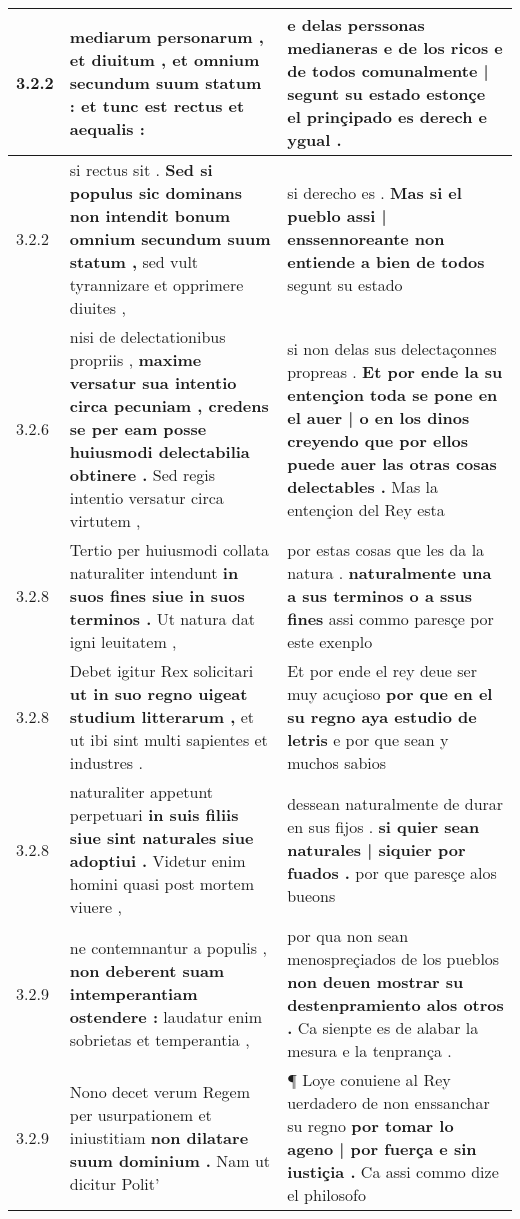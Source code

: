 \begin{tabular}{|p{1cm}|p{6.5cm}|p{6.5cm}|}
3.2.2 & mediarum personarum , et diuitum , \textbf{ et omnium secundum suum statum : } et tunc est rectus et aequalis : & e delas perssonas medianeras e de los ricos \textbf{ e de todos comunalmente | segunt su estado } estonçe el prinçipado es derech e ygual . \\\hline
3.2.2 & si rectus sit . \textbf{ Sed si populus sic dominans non intendit bonum omnium secundum suum statum , } sed vult tyrannizare et opprimere diuites , & si derecho es . \textbf{ Mas si el pueblo assi | enssennoreante non entiende a bien de todos } segunt su estado \\\hline
3.2.6 & nisi de delectationibus propriis , \textbf{ maxime versatur sua intentio circa pecuniam , credens se per eam posse huiusmodi delectabilia obtinere . } Sed regis intentio versatur circa virtutem , & si non delas sus delectaçonnes propreas . \textbf{ Et por ende la su entençion toda se pone en el auer | o en los dinos creyendo que por ellos puede auer las otras cosas delectables . } Mas la entençion del Rey esta \\\hline
3.2.8 & Tertio per huiusmodi collata naturaliter intendunt \textbf{ in suos fines siue in suos terminos . } Ut natura dat igni leuitatem , & por estas cosas que les da la natura . \textbf{ naturalmente una a sus terminos o a ssus fines } assi commo paresçe por este exenplo \\\hline
3.2.8 & Debet igitur Rex solicitari \textbf{ ut in suo regno uigeat studium litterarum , } et ut ibi sint multi sapientes et industres . & Et por ende el rey deue ser muy acuçioso \textbf{ por que en el su regno aya estudio de letris } e por que sean y muchos sabios \\\hline
3.2.8 & naturaliter appetunt perpetuari \textbf{ in suis filiis siue sint naturales siue adoptiui . } Videtur enim homini quasi post mortem viuere , & dessean naturalmente de durar en sus fijos . \textbf{ si quier sean naturales | siquier por fuados . } por que paresçe alos bueons \\\hline
3.2.9 & ne contemnantur a populis , \textbf{ non deberent suam intemperantiam ostendere : } laudatur enim sobrietas et temperantia , & por qua non sean menospreçiados de los pueblos \textbf{ non deuen mostrar su destenpramiento alos otros . } Ca sienpte es de alabar la mesura e la tenprança . \\\hline
3.2.9 & Nono decet verum Regem per usurpationem et iniustitiam \textbf{ non dilatare suum dominium . } Nam ut dicitur Polit’ & ¶ Loye conuiene al Rey uerdadero de non enssanchar su regno \textbf{ por tomar lo ageno | por fuerça e sin iustiçia . } Ca assi commo dize el philosofo \\\hline

\end{tabular}
